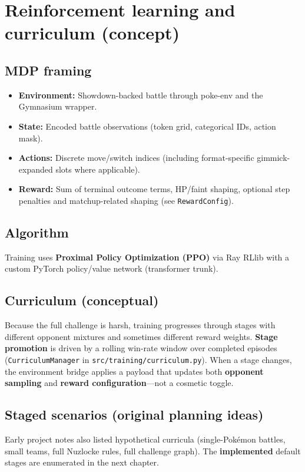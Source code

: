 \chapter{Reinforcement learning and curriculum (concept)}

\section{MDP framing}
\begin{itemize}
  \item \textbf{Environment:} Showdown-backed battle through poke-env and the Gymnasium wrapper.
  \item \textbf{State:} Encoded battle observations (token grid, categorical IDs, action mask).
  \item \textbf{Actions:} Discrete move/switch indices (including format-specific gimmick-expanded slots where applicable).
  \item \textbf{Reward:} Sum of terminal outcome terms, HP/faint shaping, optional step penalties and matchup-related shaping (see \texttt{RewardConfig}).
\end{itemize}

\section{Algorithm}
Training uses \textbf{Proximal Policy Optimization (PPO)} via Ray RLlib with a custom PyTorch policy/value network (transformer trunk).

\section{Curriculum (conceptual)}
Because the full challenge is harsh, training progresses through stages with different opponent mixtures and sometimes different reward weights. \textbf{Stage promotion} is driven by a rolling win-rate window over completed episodes (\texttt{CurriculumManager} in \texttt{src/training/curriculum.py}). When a stage changes, the environment bridge applies a payload that updates both \textbf{opponent sampling} and \textbf{reward configuration}---not a cosmetic toggle.

\section{Staged scenarios (original planning ideas)}
Early project notes also listed hypothetical curricula (single-Pok\'{e}mon battles, small teams, full Nuzlocke rules, full challenge graph). The \textbf{implemented} default stages are enumerated in the next chapter.
